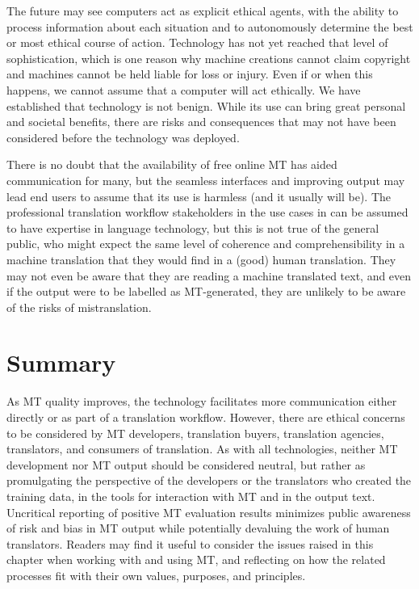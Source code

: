 \documentclass[output=paper]{langscibook}
\begin{document}
The future may see computers act as explicit ethical agents, with the ability to process information about each situation and to autonomously determine the best or most ethical course of action. Technology has not yet reached that level of sophistication, which is one reason why machine creations cannot claim copyright and machines cannot be held liable for loss or injury. Even if or when this happens, we cannot assume that a computer will act ethically. We have established that technology is not benign. While its use can bring great personal and societal benefits, there are risks and consequences that may not have been considered before the technology was deployed.

There is no doubt that the availability of free online MT has aided communication for many, but the seamless interfaces and improving output may lead end users to assume that its use is harmless (and it usually will be). The professional translation workflow stakeholders in the use cases in  can be assumed to have expertise in language technology, but this is not true of the general public, who might expect the same level of coherence and comprehensibility in a machine translation that they would find in a (good) human translation. They may not even be aware that they are reading a machine translated text, and even if the output were to be labelled as MT-generated, they are unlikely to be aware of the risks of mistranslation.

\section{{{Summary}}}\label{sec:moorkens:7}

As MT quality improves, the technology facilitates more communication either directly or as part of a translation workflow. However, there are ethical concerns to be considered by MT developers, translation buyers, translation agencies, translators, and consumers of translation. As with all technologies, neither MT development nor MT output should be considered neutral, but rather as promulgating the perspective of the developers or the translators who created the training data, in the tools for interaction with MT and in the output text. Uncritical reporting of positive MT evaluation results minimizes public awareness of risk and bias in MT output while potentially devaluing the work of human translators. Readers may find it useful to consider the issues raised in this chapter when working with and using MT, and reflecting on how the related processes fit with their own values, purposes, and principles.
\end{document}
